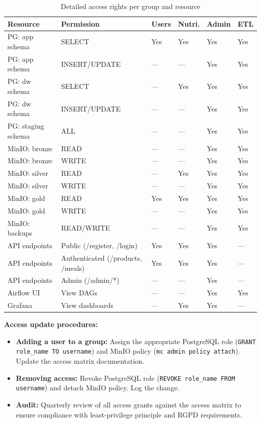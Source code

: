 \documentclass[a4paper,11pt,oneside,openany]{report}
\newcommand{\rgpd}{RGPD}
\begin{document}
\begin{table}[H]
\centering
\caption{Detailed access rights per group and resource}
\label{tab:detailed-rights}
\begin{tabularx}{\textwidth}{L{2.2cm} L{2.5cm} C{1.5cm} C{1.5cm} C{1.5cm} C{1.5cm}}
\toprule
\textbf{Resource} & \textbf{Permission} & \textbf{Users} & \textbf{Nutri.} & \textbf{Admin} & \textbf{ETL} \\
\midrule
PG: app schema & SELECT & Yes & Yes & Yes & Yes \\
PG: app schema & INSERT/UPDATE & --- & --- & Yes & Yes \\
PG: dw schema & SELECT & --- & Yes & Yes & Yes \\
PG: dw schema & INSERT/UPDATE & --- & --- & Yes & Yes \\
PG: staging schema & ALL & --- & --- & Yes & Yes \\
MinIO: bronze & READ & --- & --- & Yes & Yes \\
MinIO: bronze & WRITE & --- & --- & Yes & Yes \\
MinIO: silver & READ & --- & Yes & Yes & Yes \\
MinIO: silver & WRITE & --- & --- & Yes & Yes \\
MinIO: gold & READ & Yes & Yes & Yes & Yes \\
MinIO: gold & WRITE & --- & --- & Yes & Yes \\
MinIO: backups & READ/WRITE & --- & --- & Yes & Yes \\
API endpoints & Public (/register, /login) & Yes & Yes & Yes & --- \\
API endpoints & Authenticated (/products, /meals) & Yes & Yes & Yes & --- \\
API endpoints & Admin (/admin/*) & --- & --- & Yes & --- \\
Airflow UI & View DAGs & --- & --- & Yes & Yes \\
Grafana & View dashboards & --- & Yes & Yes & --- \\
\bottomrule
\end{tabularx}
\end{table}

\textbf{Access update procedures:}
\begin{itemize}[nosep]
  \item \textbf{Adding a user to a group:} Assign the appropriate PostgreSQL role
        (\texttt{GRANT role\_name TO username}) and MinIO policy
        (\texttt{mc admin policy attach}). Update the access matrix documentation.
  \item \textbf{Removing access:} Revoke PostgreSQL role (\texttt{REVOKE role\_name
        FROM username}) and detach MinIO policy. Log the change.
  \item \textbf{Audit:} Quarterly review of all access grants against the access
        matrix to ensure compliance with least-privilege principle and \rgpd{}
        requirements.
\end{itemize}
\end{document}
